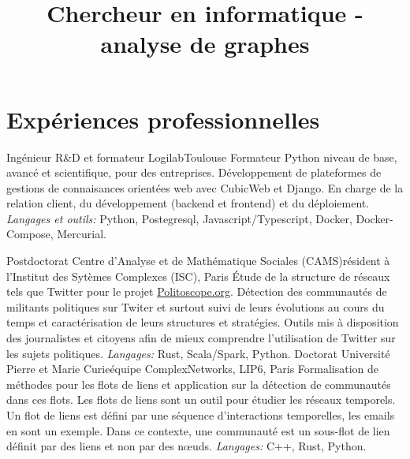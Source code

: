 \documentclass[11pt,a4paper]{moderncv}
\title{Chercheur en informatique - analyse de graphes}
\begin{document}
\maketitle
\vspace{-1.2cm}

\section{Expériences professionnelles}

 {Ingénieur R\&D et formateur} {Logilab}{}{Toulouse}
{
	Formateur Python niveau de base, avancé et scientifique, pour des entreprises.
	Développement de plateformes de gestions de connaisances orientées web avec CubicWeb et Django. En charge de la relation client, du développement (backend et frontend) et du déploiement.
	\textit{Langages et outils:} Python, Postegresql, Javascript/Typescript, Docker, Docker-Compose, Mercurial.
}

\vspace*{0.2cm}
 {Postdoctorat} {Centre d’Analyse et de Mathématique Sociales (CAMS)}{}{résident à l'Institut des Sytèmes Complexes (ISC), Paris}
{
	Étude de la structure de réseaux tels que Twitter pour le projet \url{Politoscope.org}. Détection des communautés de militants politiques sur Twiter et surtout suivi de leurs évolutions au cours du temps et caractérisation de leurs structures et stratégies. Outils mis à disposition des journalistes et citoyens afin de mieux comprendre l'utilisation de Twitter sur les sujets politiques. \textit{Langages:} Rust, Scala/Spark, Python.
}
\vspace*{0.2cm}
 {Doctorat} {Université Pierre et Marie Curie}{}{équipe ComplexNetworks, LIP6, Paris}
{
 Formalisation de méthodes pour les flots de liens et application sur la détection de communautés dans ces flots. Les flots de liens sont un outil pour étudier les réseaux temporels.
 Un flot de liens est défini par une séquence d'interactions temporelles, les emails en sont un exemple. Dans ce contexte, une communauté est un sous-flot de lien définit par des liens et non par des n\oe uds. \textit{Langages:} C++, Rust, Python.
}
\vspace*{0.2cm}
%
\vspace*{0.2cm}
\end{document}
